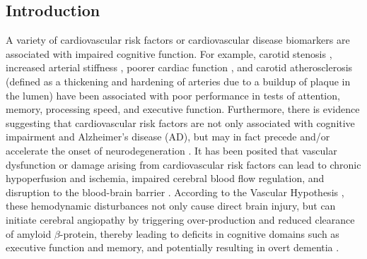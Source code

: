 \documentclass[12pt]{spieman}  %
\begin{document}
\begin{spacing}{2}   %

\section{Introduction}
\label{sect:intro}  %
\linenumbers

A variety of cardiovascular risk factors or cardiovascular disease biomarkers are associated with impaired cognitive function. For example, carotid stenosis \cite{Mathiesen2003}, increased arterial stiffness \cite{Kearney-Schwartz2009}, poorer cardiac function \cite{Sabayan2015}, and carotid atherosclerosis (defined as a thickening and hardening of arteries due to a buildup of plaque in the lumen) \cite{Romero2009} have been associated with poor performance in tests of attention, memory, processing speed, and executive function. Furthermore, there is evidence suggesting that cardiovascular risk factors are not only associated with cognitive impairment and Alzheimer's disease (AD), but may in fact precede and/or accelerate the onset of neurodegeneration \cite{Bell2009, Breteler2000, DeLaTorre2012, Honjo2012, Kovacic2012}. It has been posited that vascular dysfunction or damage arising from cardiovascular risk factors can lead to chronic hypoperfusion and ischemia, impaired cerebral blood flow regulation, and disruption to the blood-brain barrier \cite{Bell2009}.  According to the Vascular Hypothesis \cite{DeLaTorre1993, DelaTorre2018}, these hemodynamic disturbances not only cause direct brain injury, but can initiate cerebral angiopathy by triggering over-production and reduced clearance of amyloid $\beta$-protein, thereby leading to deficits in cognitive domains such as executive function and memory, and potentially resulting in overt dementia \cite{Rensink2003, Honjo2012, Bell2009, DeLaTorre2012}. 


\end{spacing}
\end{document}
